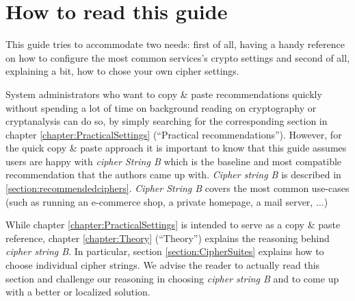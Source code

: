 \section{How to read this guide}
\label{sec:how-read-this}
This guide tries to accommodate two needs: first of all, having a handy reference on how to configure the most common services's crypto settings and second of all, explaining a bit, how to chose your own cipher settings.

System administrators who want to copy \& paste recommendations quickly without spending a lot of time on background reading on cryptography or cryptanalysis can do so, by simply searching for the corresponding section in chapter \ref{chapter:PracticalSettings} (``Practical recommendations''). However, for the quick copy \& paste approach it is important to know that this guide assumes users are happy with \textit{cipher String B} which is the baseline and most compatible recommendation that the authors came up with. \textit{Cipher string B} is described in \ref{section:recommendedciphers}. \textit{Cipher String B} covers the most common use-cases (such as running an e-commerce shop, a private homepage, a mail server, $ \ldots $)

While chapter \ref{chapter:PracticalSettings} is intended to serve as a copy \& paste reference, chapter \ref{chapter:Theory} (``Theory'') explains the reasoning behind \textit{cipher string B}. In particular, section \ref{section:CipherSuites} explains how to choose individual cipher strings. We advise the reader to actually read this section and challenge our reasoning in choosing \textit{cipher string B} and to come up with a better  or localized solution.


